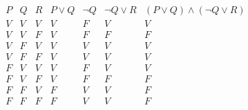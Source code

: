\documentclass[12pt,a4paper]{article}
\begin{document}
\begin{table}[h]
\centering
\[
\begin{array}{c|c|c|c|c|c|c}
P & Q & R & P \lor Q & \neg Q & \neg Q \lor R & (P \lor Q) \land (\neg Q \lor R) \\
\hline
V & V & V & V & F & V & V \\
V & V & F & V & F & F & F \\
V & F & V & V & V & V & V \\
V & F & F & V & V & V & V \\
F & V & V & V & F & V & V \\
F & V & F & V & F & F & F \\
F & F & V & F & V & V & F \\
F & F & F & F & V & V & F \\
\end{array}
\]
\caption{Tabela verdade da expressão $(P \lor Q) \land (\neg Q \lor R)$}
\end{table}
\end{document}
